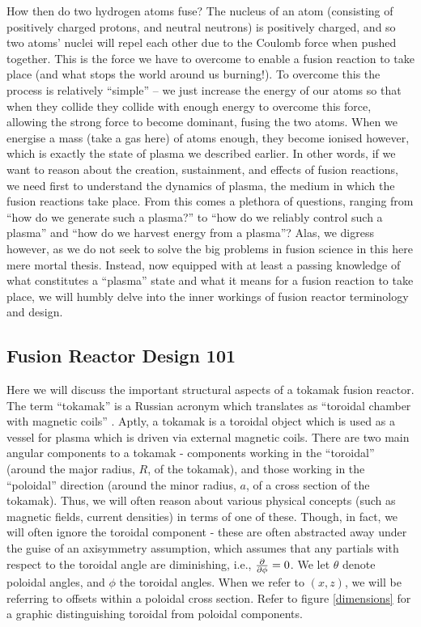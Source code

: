 How then do two hydrogen atoms fuse? The nucleus of an atom (consisting of positively charged 
protons, and neutral neutrons) is positively charged, and so two atoms' nuclei will repel each other due to the Coulomb force when pushed together. This is the force 
we have to overcome to enable a fusion reaction to take place (and what stops the world around us burning!). To overcome this the process is relatively ``simple'' -- 
we just increase the energy of our atoms so that when they collide they collide with enough energy to overcome this force, allowing the strong force to become
dominant, fusing the two atoms. When we energise a mass (take a gas here) of atoms enough, they become ionised however, which is 
exactly the state of plasma we described earlier. In other words, if we want to reason about the creation, sustainment, and effects of 
fusion reactions, we need first to understand the dynamics of plasma, the medium in which the fusion reactions take place. From this comes a plethora of questions, ranging from 
``how do we generate such a plasma?'' to ``how do we reliably control such a plasma'' and ``how do we harvest energy from a plasma''? Alas, we 
digress however, as we do not seek to solve the big problems in fusion science in this here mere mortal thesis. Instead, now equipped 
with at least a passing knowledge of what constitutes a ``plasma'' state and what it means for a fusion reaction to take place, 
we will humbly delve into the inner workings of fusion reactor terminology and design.


\subsection{Fusion Reactor Design 101}

Here we will discuss the important structural aspects of a tokamak fusion reactor. The term ``tokamak'' is a 
Russian acronym which translates as ``toroidal chamber with magnetic coils'' \cite{iter-tokamak-acronym}. Aptly, a tokamak is a toroidal 
object which is used as a vessel for plasma which is driven via external magnetic coils. There are two main angular components 
to a tokamak - components working in the ``toroidal'' (around the major radius, $R$, of the tokamak), and those working in the 
``poloidal'' direction (around the minor radius, $a$, of a cross section of the tokamak). Thus, we will often reason about 
various physical concepts (such as magnetic fields, current densities) in terms of one of these. Though, in fact, we will 
often ignore the toroidal component - these are often abstracted away under the guise of an axisymmetry assumption, which assumes 
that any partials with respect to the toroidal angle are diminishing, i.e., $\pdv{\phi} = 0$. We let $\theta$ denote poloidal angles, 
and $\phi$ the toroidal angles. When we refer to $(x,z)$, we will be referring to offsets within a poloidal cross section. 
Refer to figure \ref{dimensions} for a graphic distinguishing toroidal from poloidal components.

